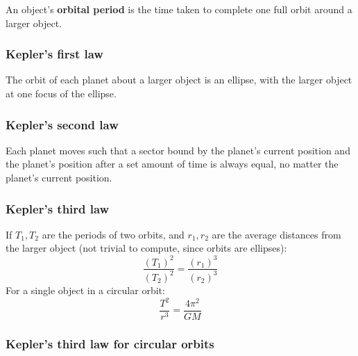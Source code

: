 \documentclass{article}
\newcommand{\definition}[1]{\begin{tcolorbox}[colback=red!5!white,colframe=red!75!black,parbox=false] #1 \end{tcolorbox}}
\newcommand{\theorem}[2]{\begin{tcolorbox}[title={#1},colback=blue!5!white,colframe=blue!75!black,parbox=false] #2 \end{tcolorbox}}
\begin{document}
\definition{An object's \textbf{orbital period} is the time taken to complete one full orbit around a larger object.}

\subsubsection{Kepler's first law}

\theorem{Kepler's first law}{The orbit of each planet about a larger object is an ellipse, with the larger object at one focus of the ellipse.}

\subsubsection{Kepler's second law}

\theorem{Kepler's second law}{Each planet moves such that a sector bound by the planet's current position and the planet's position after a set amount of time is always equal, no matter the planet's current position.}

\subsubsection{Kepler's third law}

\theorem{Kepler's third law}{If $T_1,T_2$ are the periods of two orbits, and $r_1,r_2$ are the average distances from the larger object (not trivial to compute, since orbits are ellipses):
\begin{equation*}
    \frac{(T_1)^2}{(T_2)^2}=\frac{(r_1)^3}{(r_2)^3}
\end{equation*}
For a single object in a circular orbit:
\begin{equation*}
	\frac{T^2}{r^3}=\frac{4\pi^2}{GM}
\end{equation*}}

\subsubsection{Kepler's third law for circular orbits}
\end{document}
